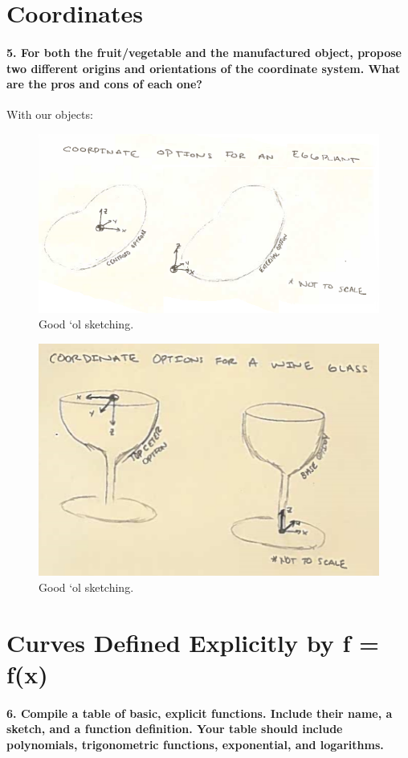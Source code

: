 \documentclass{article}
\begin{document}
\section{Coordinates}

\paragraph{5. For both the fruit/vegetable and the manufactured object, propose two different origins and orientations of the coordinate system. What are the pros and cons of each one?} 

With our objects:

\begin{figure}[h!]
    \centering
    \includegraphics[width=0.55\columnwidth]{figs_and_code/coordinate_eggplant.jpg}
    \caption{Good `ol sketching.}
\end{figure}

\begin{figure}[h!]
    \centering
    \includegraphics[width=0.55\columnwidth]{figs_and_code/coordinate_wine.jpg}
    \caption{Good `ol sketching.}
\end{figure}


\section{Curves Defined Explicitly by f = f(x)}

\paragraph{6. Compile a table of basic, explicit functions. Include their name, a sketch, and a function definition. Your  table should include polynomials, trigonometric functions, exponential, and logarithms.} 
\end{document}
